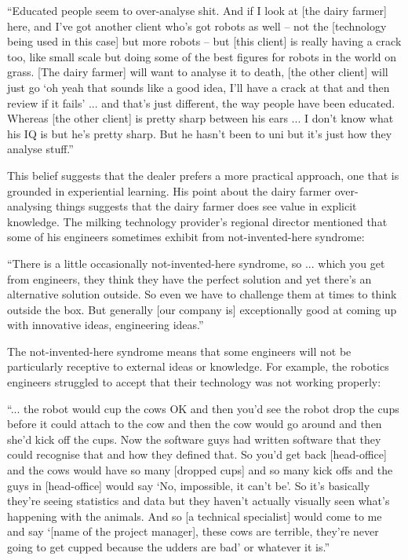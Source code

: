 \begin{displayquote}[Participant 15/2]
\small
\enquote{Educated people seem to over-analyse shit. And if I look at [the dairy farmer] here, and I've got another client who's got robots as well – not the [technology being used in this case] but more robots – but [this client] is really having a crack too, like small scale but doing some of the best figures for robots in the world on grass. [The dairy farmer] will want to analyse it to death, [the other client] will just go \enquote{oh yeah that sounds like a good idea, I'll have a crack at that and then review if it fails} ... and that's just different, the way people have been educated.  Whereas [the other client] is pretty sharp between his ears ... I don’t know what his IQ is but he's pretty sharp. But he hasn't been to uni but it's just how they analyse stuff.} 
\end{displayquote}


This belief suggests that the dealer prefers a more practical approach, one that is grounded in experiential learning. His point about the dairy farmer over-analysing things suggests that the dairy farmer does see value in explicit knowledge. The milking technology provider's regional director mentioned that some of his engineers sometimes exhibit from not-invented-here syndrome:

\begin{displayquote}[Participant 18/2]
\small
\enquote{There is a little occasionally not-invented-here syndrome, so ... which you get from engineers, they think they have the perfect solution and yet there's an alternative solution outside. So even we have to challenge them at times to think outside the box. But generally [our company is] exceptionally good at coming up with innovative ideas, engineering ideas.} 
\end{displayquote}


The not-invented-here syndrome means that some engineers will not be particularly receptive to external ideas or knowledge. For example, the robotics engineers struggled to accept that their technology was not working properly:  

\begin{displayquote}[Participant 9/2]
\small
\enquote{... the robot would cup the cows OK and then you'd see the robot drop the cups before it could attach to the cow and then the cow would go around and then she'd kick off the cups. Now the software guys had written software that they could recognise that and how they defined that. So you'd get back [head-office] and the cows would have so many [dropped cups] and so many kick offs and the guys in [head-office] would say \enquote{No, impossible, it can't be}. So it's basically they're seeing statistics and data but they haven't actually visually seen what's happening with the animals. And so [a technical specialist] would come to me and say \enquote{[name of the project manager], these cows are terrible, they're never going to get cupped because the udders are bad} or whatever it is.} 
\end{displayquote}


